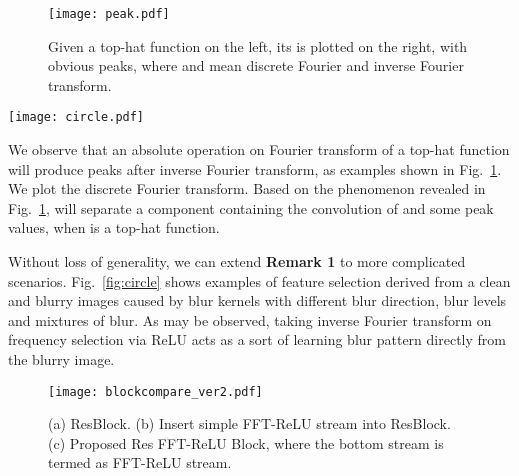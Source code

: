 \documentclass[letterpaper]{article} \usepackage{aaai23}  \usepackage{times}  \usepackage{helvet}  \usepackage{courier}  \usepackage[hyphens]{url}  \usepackage{graphicx} \usepackage{enumitem}
\begin{document}
\begin{figure}[t]
\begin{center}
    \texttt{[image: peak.pdf]}
\end{center}
\caption{Given a top-hat function  on the left, its  is plotted on the right, with obvious peaks, where  and  mean discrete Fourier and inverse Fourier transform.} 
\label{fig:peak}
\end{figure}

\begin{figure*}[t]
\begin{center}
    \texttt{[image: circle.pdf]}
\end{center}
\caption{We use a circle image as an example for sharp image . The image is blurred () by linear kernels with motion blur of different directions , different blur levels and a mixture of blur. Blur kernel-like images are calculated by the equations below the image. The middle image of the sharp image is visualized for reference. See more details in the supplementary material about equations  and  (best viewed  by zoom-in on screen).}
\label{fig:circle}
\end{figure*}

We observe that an absolute operation on Fourier transform of a top-hat function will produce peaks after inverse Fourier transform, as examples shown in Fig.~\ref{fig:peak}. We plot the discrete Fourier transform. Based on the phenomenon revealed in Fig.~\ref{fig:peak},  will separate a component containing the convolution of  and some peak values, when  is a top-hat function.

Without loss of generality, we can extend \textbf{Remark 1} to more complicated scenarios. Fig.~\ref{fig:circle} shows examples of feature selection derived from a clean and blurry images caused by blur kernels with different blur direction, blur levels and mixtures of blur. As may be observed, taking inverse Fourier transform on frequency selection via ReLU acts as a sort of learning blur pattern directly from the blurry image. 

\begin{figure}[t]
\begin{center}
    \texttt{[image: blockcompare\_ver2.pdf]}
\end{center}
\caption{(a) ResBlock. (b) Insert simple FFT-ReLU stream into ResBlock. (c) Proposed Res FFT-ReLU Block, where the bottom stream is termed as FFT-ReLU stream.} 
\label{fig:blockcompare}
\end{figure}
\end{document}
